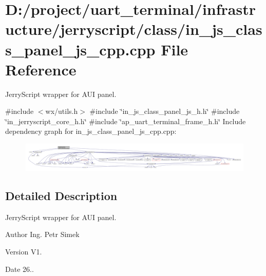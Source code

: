 \section{D\+:/project/uart\+\_\+terminal/infrastructure/jerryscript/class/in\+\_\+js\+\_\+class\+\_\+panel\+\_\+js\+\_\+cpp.cpp File Reference}
\label{in__js__class__panel__js__cpp_8cpp}


Jerry\+Script wrapper for A\+UI panel.  


{\ttfamily \#include $<$wx/utils.\+h$>$}\newline
{\ttfamily \#include \char`\"{}in\+\_\+js\+\_\+class\+\_\+panel\+\_\+js\+\_\+h.\+h\char`\"{}}\newline
{\ttfamily \#include \char`\"{}in\+\_\+jerryscript\+\_\+core\+\_\+h.\+h\char`\"{}}\newline
{\ttfamily \#include \char`\"{}ap\+\_\+uart\+\_\+terminal\+\_\+frame\+\_\+h.\+h\char`\"{}}\newline
Include dependency graph for in\+\_\+js\+\_\+class\+\_\+panel\+\_\+js\+\_\+cpp.\+cpp\+:
\nopagebreak
\begin{figure}[H]
\begin{center}
\leavevmode
\includegraphics[width=350pt]{in__js__class__panel__js__cpp_8cpp__incl}
\end{center}
\end{figure}


\subsection{Detailed Description}
Jerry\+Script wrapper for A\+UI panel. 

\begin{DoxyAuthor}{Author}
Ing. Petr Simek 
\end{DoxyAuthor}
\begin{DoxyVersion}{Version}
V1. 
\end{DoxyVersion}
\begin{DoxyDate}{Date}
26.. 
\end{DoxyDate}
